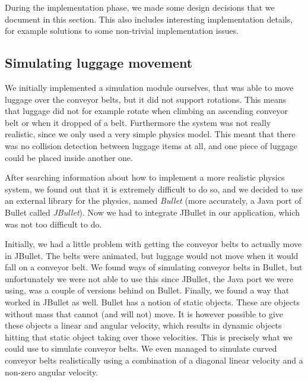 During the implementation phase, we made some design decisions that we document in this section. This also includes interesting implementation details, for example solutions to some non-trivial implementation issues.

\subsection{Simulating luggage movement}
We initially implemented a simulation module ourselves, that was able to move luggage over the conveyor belts, but it did not support rotations. This means that luggage did not for example rotate when climbing an ascending conveyor belt or when it dropped of a belt. Furthermore the system was not really realistic, since we only used a very simple physics model. This meant that there was no collision detection between luggage items at all, and one piece of luggage could be placed inside another one.

After searching information about how to implement a more realistic physics system, we found out that it is extremely difficult to do so, and we decided to use an external library for the physics, named \emph{Bullet} (more accurately, a Java port of Bullet called \emph{JBullet}). Now we had to integrate JBullet in our application, which was not too difficult to do.

Initially, we had a little problem with getting the conveyor belts to actually move in JBullet. The belts were animated, but luggage would not move when it would fall on a conveyor belt. We found ways of simulating conveyor belts in Bullet, but unfortunately we were not able to use this since JBullet, the Java port we were using, was a couple of versions behind on Bullet. Finally, we found a way that worked in JBullet as well. Bullet has a notion of static objects. These are objects without mass that cannot (and will not) move. It is however possible to give these objects a linear and angular velocity, which results in dynamic objects hitting that static object taking over those velocities. This is precisely what we could use to simulate conveyor belts. We even managed to simulate curved conveyor belts realistically using a combination of a diagonal linear velocity and a non-zero angular velocity.